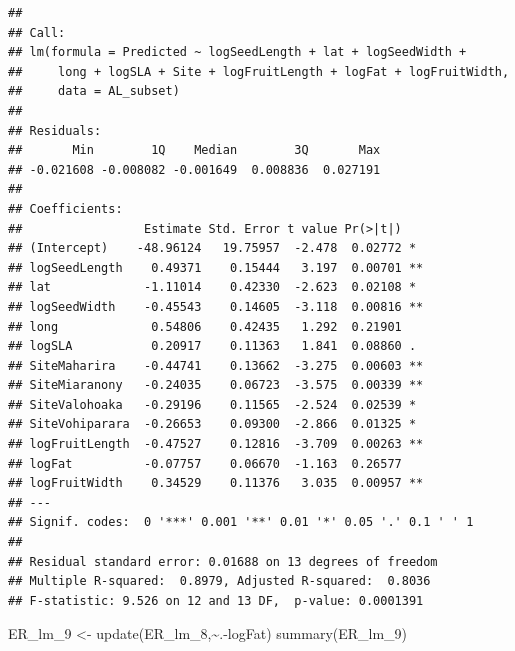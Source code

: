 \documentclass[
  12pt,
]{article}
\newenvironment{Shaded}{\begin{snugshade}}{\end{snugshade}}
\newcommand{\FunctionTok}[1]{\textcolor[rgb]{0.00,0.00,0.00}{#1}}
\newcommand{\NormalTok}[1]{#1}
\newcommand{\OtherTok}[1]{\textcolor[rgb]{0.56,0.35,0.01}{#1}}
\newcommand{\SpecialCharTok}[1]{\textcolor[rgb]{0.00,0.00,0.00}{#1}}
\begin{document}
\begin{verbatim}
## 
## Call:
## lm(formula = Predicted ~ logSeedLength + lat + logSeedWidth + 
##     long + logSLA + Site + logFruitLength + logFat + logFruitWidth, 
##     data = AL_subset)
## 
## Residuals:
##       Min        1Q    Median        3Q       Max 
## -0.021608 -0.008082 -0.001649  0.008836  0.027191 
## 
## Coefficients:
##                 Estimate Std. Error t value Pr(>|t|)   
## (Intercept)    -48.96124   19.75957  -2.478  0.02772 * 
## logSeedLength    0.49371    0.15444   3.197  0.00701 **
## lat             -1.11014    0.42330  -2.623  0.02108 * 
## logSeedWidth    -0.45543    0.14605  -3.118  0.00816 **
## long             0.54806    0.42435   1.292  0.21901   
## logSLA           0.20917    0.11363   1.841  0.08860 . 
## SiteMaharira    -0.44741    0.13662  -3.275  0.00603 **
## SiteMiaranony   -0.24035    0.06723  -3.575  0.00339 **
## SiteValohoaka   -0.29196    0.11565  -2.524  0.02539 * 
## SiteVohiparara  -0.26653    0.09300  -2.866  0.01325 * 
## logFruitLength  -0.47527    0.12816  -3.709  0.00263 **
## logFat          -0.07757    0.06670  -1.163  0.26577   
## logFruitWidth    0.34529    0.11376   3.035  0.00957 **
## ---
## Signif. codes:  0 '***' 0.001 '**' 0.01 '*' 0.05 '.' 0.1 ' ' 1
## 
## Residual standard error: 0.01688 on 13 degrees of freedom
## Multiple R-squared:  0.8979, Adjusted R-squared:  0.8036 
## F-statistic: 9.526 on 12 and 13 DF,  p-value: 0.0001391
\end{verbatim}

\begin{Shaded}
\begin{Highlighting}[]
\NormalTok{ER\_lm\_9 }\OtherTok{\textless{}{-}} \FunctionTok{update}\NormalTok{(ER\_lm\_8,}\SpecialCharTok{\textasciitilde{}}\NormalTok{.}\SpecialCharTok{{-}}\NormalTok{logFat)}
\FunctionTok{summary}\NormalTok{(ER\_lm\_9)}
\end{Highlighting}
\end{Shaded}
\end{document}
